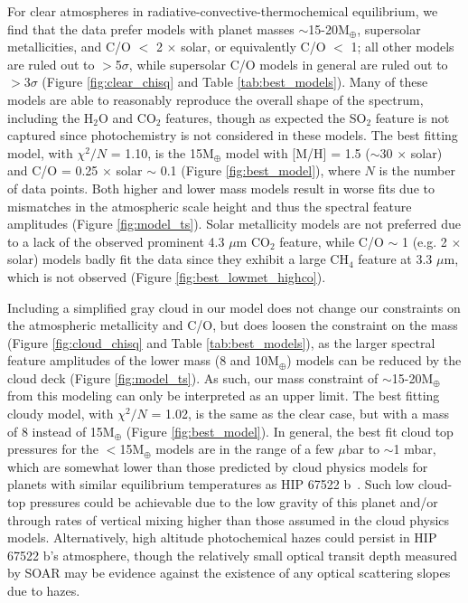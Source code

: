 \documentclass[twocolumn]{aastex63} %
\newcommand{\plname}{HIP 67522 b}
\begin{document}
For clear atmospheres in radiative-convective-thermochemical equilibrium, we find that the data prefer models with planet masses $\sim$15-20M$_{\oplus}$, supersolar metallicities, and C/O $<$ 2 $\times$ solar, or equivalently C/O $<$ 1; all other models are ruled out to $>$5$\sigma$, while supersolar C/O models in general are ruled out to $>$3$\sigma$ (Figure \ref{fig:clear_chisq} and Table \ref{tab:best_models}). Many of these models are able to reasonably reproduce the overall shape of the spectrum, including the H$_2$O and CO$_2$ features, though as expected the SO$_2$ feature is not captured since photochemistry is not considered in these models. The best fitting model, with $\chi^2/N$ = 1.10, is the 15M$_{\oplus}$ model with [M/H] = 1.5 ($\sim$30 $\times$ solar) and C/O = 0.25 $\times$ solar $\sim$ 0.1 (Figure \ref{fig:best_model}), where $N$ is the number of data points. Both higher and lower mass models result in worse fits due to mismatches in the atmospheric scale height and thus the spectral feature amplitudes (Figure \ref{fig:model_ts}). Solar metallicity models are not preferred due to a lack of the observed prominent 4.3 $\mu$m CO$_2$ feature, while C/O $\sim$ 1 (e.g. 2 $\times$ solar) models badly fit the data since they exhibit a large CH$_4$ feature at 3.3 $\mu$m, which is not observed (Figure \ref{fig:best_lowmet_highco}). 

Including a simplified gray cloud in our model does not change our constraints on the atmospheric metallicity and C/O, but does loosen the constraint on the mass (Figure \ref{fig:cloud_chisq} and Table \ref{tab:best_models}), as the larger spectral feature amplitudes of the lower mass (8 and 10M$_{\oplus}$) models can be reduced by the cloud deck (Figure \ref{fig:model_ts}). As such, our mass constraint of $\sim$15-20M$_{\oplus}$ from this modeling can only be interpreted as an upper limit. The best fitting cloudy model, with $\chi^2/N$ = 1.02, is the same as the clear case, but with a mass of 8 instead of 15M$_{\oplus}$ (Figure \ref{fig:best_model}). In general, the best fit cloud top pressures for the $<$15M$_{\oplus}$ models are in the range of a few $\mu$bar to $\sim$1 mbar, which are somewhat lower than those predicted by cloud physics models for planets with similar equilibrium temperatures as \plname\ \citep[e.g.][]{gao2020}. Such low cloud-top pressures could be achievable due to the low gravity of this planet and/or through rates of vertical mixing higher than those assumed in the cloud physics models. Alternatively, high altitude photochemical hazes could persist in \plname's atmosphere, though the relatively small optical transit depth measured by SOAR may be evidence against the existence of any optical scattering slopes due to hazes. 
\end{document}
